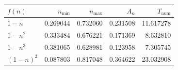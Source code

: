 \begin{tabular}{lrrrr}
\toprule
$f(n)$ & $n_{\min}$ & $n_{\max}$ & $A_n$ & $T_{\mathrm{num}}$ \\
\midrule
$1-n$ & 0.269044 & 0.732060 & 0.231508 & 11.617278 \\
$1-n^2$ & 0.333484 & 0.676221 & 0.171369 & 8.632810 \\
$1-n^3$ & 0.381065 & 0.628981 & 0.123958 & 7.305745 \\
$(1-n)^2$ & 0.087803 & 0.817048 & 0.364622 & 23.032908 \\
\bottomrule
\end{tabular}
